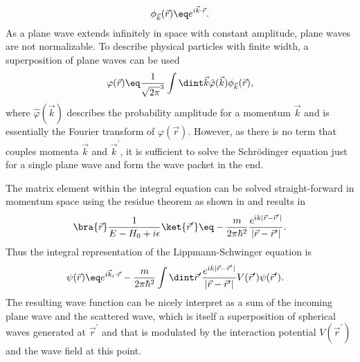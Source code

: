 \documentclass[\main/dresen_thesis.tex]{subfiles}
\begin{document}
    \begin{align}
      \phi_{\vec{k}}(\vec{r}) \eq e^{i\vec{k} \cdot \vec{r}}.
    \end{align}
    As a plane wave extends infinitely in space with constant amplitude, plane waves are not normalizable.
    To describe physical particles with finite width, a superposition of plane waves can be used
    \begin{align}
      \varphi(\vec{r}) \eq \frac{1}{\sqrt{2 \pi}^3} \int \dint \vec{k} \hat{\varphi} (\vec{k}) \phi_{\vec{k}}(\vec{r}),
    \end{align}
    where $\hat{\varphi} (\vec{k})$ describes the probability amplitude for a momentum $\vec{k}$ and is essentially the Fourier transform of $\varphi(\vec{r})$.
    However, as there is no term that couples momenta $\vec{k}$ and $\vec{k}^\prime$, it is sufficient to solve the Schr\"odinger equation just for a single plane wave and form the wave packet in the end.

    The matrix element within the integral equation  can be solved straight-forward in momentum space using the residue theorem as shown in  and results in
    \begin{align}
      \bra{\vec{r}}\frac{1}{E - H_0 + i \epsilon} \ket{\vec{r}^\prime} \eq -\frac{m}{2 \pi \hbar^2} \frac{e^{ik|\vec{r} - \vec{r}^\prime|}}{|\vec{r} - \vec{r}^\prime|}.
    \end{align}
    Thus the integral representation of the Lippmann-Schwinger equation is
    \begin{align}
      \psi (\vec{r}) &\eq e^{i\vec{k}_i \cdot \vec{r}} - \frac{m}{2 \pi\hbar^2} \int \dint \vec{r}^\prime \frac{e^{ik|\vec{r} - \vec{r}^\prime|}}{|\vec{r} - \vec{r}^\prime|} V (\vec{r}^\prime)\psi (\vec{r}^\prime).
    \end{align}
    The resulting wave function can be nicely interpret as a sum of the incoming plane wave and the scattered wave, which is itself a superposition of spherical waves generated at $\vec{r}^\prime$ and that is modulated by the interaction potential $V(\vec{r}^\prime)$ and the wave field at this point.
\end{document}
